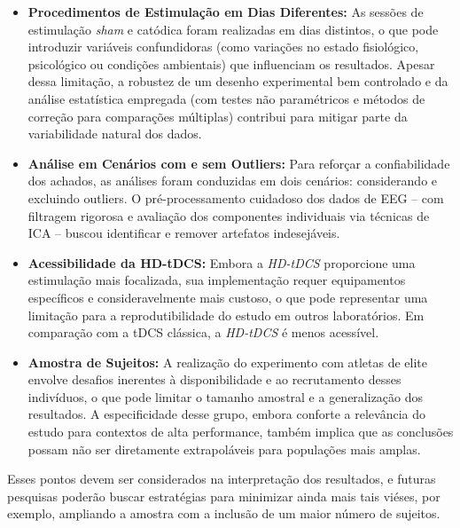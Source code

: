 \begin{itemize}
    \item \textbf{Procedimentos de Estimulação em Dias Diferentes:} As sessões de estimulação \emph{sham} e catódica foram realizadas em dias distintos, o que pode introduzir variáveis confundidoras (como variações no estado fisiológico, psicológico ou condições ambientais) que influenciam os resultados. Apesar dessa limitação, a robustez de um desenho experimental bem controlado e da análise estatística empregada (com testes não paramétricos e métodos de correção para comparações múltiplas) contribui para mitigar parte da variabilidade natural dos dados.
    
    \item \textbf{Análise em Cenários com e sem Outliers:} Para reforçar a confiabilidade dos achados, as análises foram conduzidas em dois cenários: considerando e excluindo outliers. O pré-processamento cuidadoso dos dados de EEG – com filtragem rigorosa e avaliação dos componentes individuais via técnicas de ICA – buscou identificar e remover artefatos indesejáveis.
    
    \item \textbf{Acessibilidade da HD-tDCS:} Embora a \emph{HD-tDCS} proporcione uma estimulação mais focalizada, sua implementação requer equipamentos específicos e consideravelmente mais custoso, o que pode representar uma limitação para a reprodutibilidade do estudo em outros laboratórios. Em comparação com a tDCS clássica, a \emph{HD-tDCS} é menos acessível.
    
    \item \textbf{Amostra de Sujeitos:} A realização do experimento com atletas de elite envolve desafios inerentes à disponibilidade e ao recrutamento desses indivíduos, o que pode limitar o tamanho amostral e a generalização dos resultados. A especificidade desse grupo, embora conforte a relevância do estudo para contextos de alta performance, também implica que as conclusões possam não ser diretamente extrapoláveis para populações mais amplas.
\end{itemize}

Esses pontos devem ser considerados na interpretação dos resultados, e futuras pesquisas poderão buscar estratégias para minimizar ainda mais tais viéses, por exemplo, ampliando a amostra com a inclusão de um maior número de sujeitos.